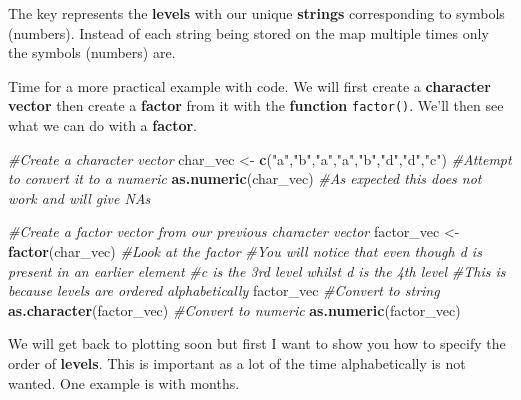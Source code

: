 \documentclass[]{book}
\newenvironment{Shaded}{\begin{snugshade}}{\end{snugshade}}
\newcommand{\KeywordTok}[1]{\textcolor[rgb]{0.13,0.29,0.53}{\textbf{#1}}}
\newcommand{\StringTok}[1]{\textcolor[rgb]{0.31,0.60,0.02}{#1}}
\newcommand{\CommentTok}[1]{\textcolor[rgb]{0.56,0.35,0.01}{\textit{#1}}}
\newcommand{\NormalTok}[1]{#1}
\begin{document}
The key represents the \textbf{levels} with our unique \textbf{strings}
corresponding to symbols (numbers). Instead of each string being stored
on the map multiple times only the symbols (numbers) are.

Time for a more practical example with code. We will first create a
\textbf{character vector} then create a \textbf{factor} from it with the
\textbf{function} \texttt{factor()}. We'll then see what we can do with
a \textbf{factor}.

\begin{Shaded}
\begin{Highlighting}[]
\CommentTok{#Create a character vector}
\NormalTok{char_vec <-}\StringTok{ }\KeywordTok{c}\NormalTok{(}\StringTok{"a"}\NormalTok{,}\StringTok{"b"}\NormalTok{,}\StringTok{"a"}\NormalTok{,}\StringTok{"a"}\NormalTok{,}\StringTok{"b"}\NormalTok{,}\StringTok{"d"}\NormalTok{,}\StringTok{"d"}\NormalTok{,}\StringTok{"c"}\NormalTok{)}
\CommentTok{#Attempt to convert it to a numeric}
\KeywordTok{as.numeric}\NormalTok{(char_vec)}
\CommentTok{#As expected this does not work and will give NAs}

\CommentTok{#Create a factor vector from our previous character vector}
\NormalTok{factor_vec <-}\StringTok{ }\KeywordTok{factor}\NormalTok{(char_vec)}
\CommentTok{#Look at the factor}
\CommentTok{#You will notice that even though d is present in an earlier element}
\CommentTok{#c is the 3rd level whilst d is the 4th level}
\CommentTok{#This is because levels are ordered alphabetically}
\NormalTok{factor_vec}
\CommentTok{#Convert to string}
\KeywordTok{as.character}\NormalTok{(factor_vec)}
\CommentTok{#Convert to numeric}
\KeywordTok{as.numeric}\NormalTok{(factor_vec)}
\end{Highlighting}
\end{Shaded}

We will get back to plotting soon but first I want to show you how to
specify the order of \textbf{levels}. This is important as a lot of the
time alphabetically is not wanted. One example is with months.
\end{document}
